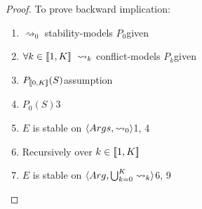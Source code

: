 \begin{theorem}
\begin{proof}
		To prove backward implication:
		\begin{enumerate}
			\item$\rightsquigarrow_0$ stability-models $P_0$\hfill given
			\item$\forall k\in\intset{1,K}\ \rightsquigarrow_k$ conflict-models $P_k$\hfill given
			\item$P_{[\![{0,K}]\!]}(S)$\hfill assumption
			\item$P_0(S)$\hfill 3
			\item$E$ is stable on $\langle{Args},{\rightsquigarrow_0}\rangle$\hfill 1, 4
			\item Recursively over $k\in[\![{1,K}]\!]$
			\item $E$ is stable on $\langle{Arg},{\bigcup_{k=0}^K\rightsquigarrow_k}\rangle$\hfill 6, 9
		\end{enumerate}
	\end{proof}
\end{theorem}

